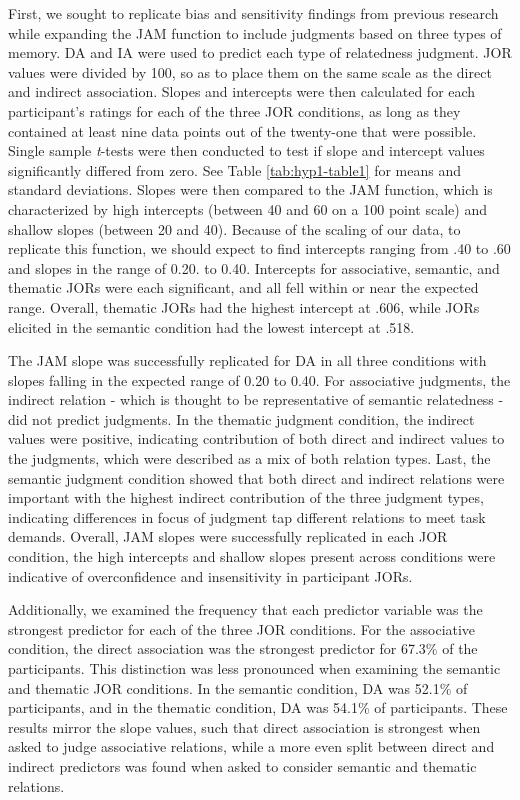 \documentclass[english,,man]{apa6}
\begin{document}
First, we sought to replicate bias and sensitivity findings from previous research while expanding the JAM function to include judgments based on three types of memory. DA and IA were used to predict each type of relatedness judgment. JOR values were divided by 100, so as to place them on the same scale as the direct and indirect association. Slopes and intercepts were then calculated for each participant's ratings for each of the three JOR conditions, as long as they contained at least nine data points out of the twenty-one that were possible. Single sample \emph{t}-tests were then conducted to test if slope and intercept values significantly differed from zero. See Table \ref{tab:hyp1-table1} for means and standard deviations. Slopes were then compared to the JAM function, which is characterized by high intercepts (between 40 and 60 on a 100 point scale) and shallow slopes (between 20 and 40). Because of the scaling of our data, to replicate this function, we should expect to find intercepts ranging from .40 to .60 and slopes in the range of 0.20. to 0.40. Intercepts for associative, semantic, and thematic JORs were each significant, and all fell within or near the expected range. Overall, thematic JORs had the highest intercept at .606, while JORs elicited in the semantic condition had the lowest intercept at .518.

The JAM slope was successfully replicated for DA in all three conditions with slopes falling in the expected range of 0.20 to 0.40. For associative judgments, the indirect relation - which is thought to be representative of semantic relatedness - did not predict judgments. In the thematic judgment condition, the indirect values were positive, indicating contribution of both direct and indirect values to the judgments, which were described as a mix of both relation types. Last, the semantic judgment condition showed that both direct and indirect relations were important with the highest indirect contribution of the three judgment types, indicating differences in focus of judgment tap different relations to meet task demands. Overall, JAM slopes were successfully replicated in each JOR condition, the high intercepts and shallow slopes present across conditions were indicative of overconfidence and insensitivity in participant JORs.

Additionally, we examined the frequency that each predictor variable was the strongest predictor for each of the three JOR conditions. For the associative condition, the direct association was the strongest predictor for 67.3\% of the participants. This distinction was less pronounced when examining the semantic and thematic JOR conditions. In the semantic condition, DA was 52.1\% of participants, and in the thematic condition, DA was 54.1\% of participants. These results mirror the slope values, such that direct association is strongest when asked to judge associative relations, while a more even split between direct and indirect predictors was found when asked to consider semantic and thematic relations.
\end{document}
